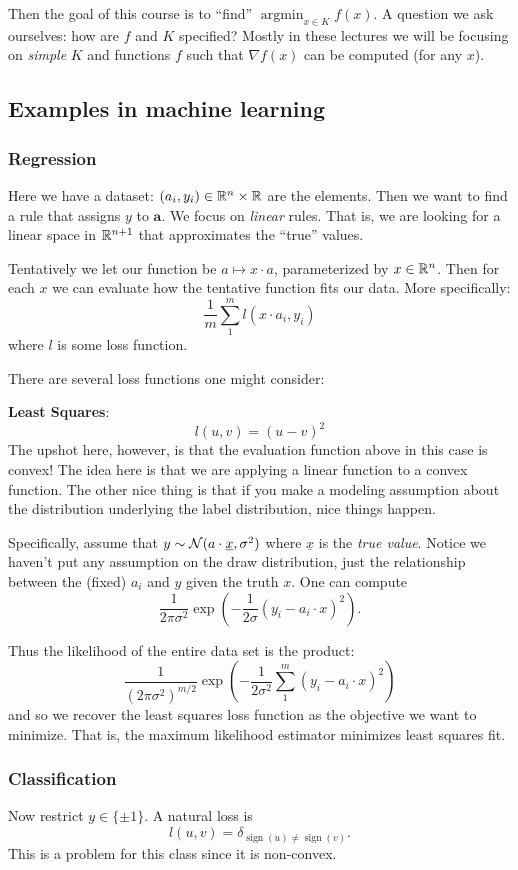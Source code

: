 \documentclass[12pt]{article}
\begin{document}
Then the goal of this course is to ``find'' $\operatorname{argmin}_{x\in K}f(x)$. A question we ask ourselves: how are $f$ and $K$ specified? Mostly in these lectures we will be 
focusing on \textit{simple} $K$ and functions $f$ such that $\nabla f(x)$ can be computed (for any $x$).

\subsection{Examples in machine learning}
\subsubsection{Regression}
Here we have a dataset: $(a_i,y_i)\in\mathbb{R}^n\times\mathbb{R}$ are the elements. Then we want to find a rule that assigns $y$ to $\mathbf a$. We focus on \textit{linear} rules.
That is, we are looking for a linear space in $\mathbb{R}^{n+1}$ that approximates the ``true'' values.

Tentatively we let our function be $a\mapsto x\cdot a$, parameterized by $x\in\mathbb{R}^n$. Then for each $x$ we can evaluate how the tentative function
fits our data. More specifically:
\[\frac{1}{m}\sum_1^m l(x\cdot a_i,y_i)\]
where $l$ is some loss function.

There are several loss functions one might consider:

\noindent\textbf{Least Squares}: 
\[l(u,v)=(u-v)^2\] 
The upshot here, however, is that the evaluation function above in this case is convex!
The idea here is that we are applying a linear function to a convex function. The other nice thing is that if you make a modeling assumption about the 
distribution underlying the label distribution, nice things happen.

Specifically, assume that $y\sim\mathcal{N}(a\cdot \underline x,\sigma^2)$ where $\underline x$ is the \textit{true value}.
Notice we haven't put any assumption on the draw distribution, just the relationship between the (fixed) $a_i$ and $y$ given the truth $x$. One can compute 
\[\frac{1}{2\pi\sigma^2}\exp(-\frac{1}{2\sigma}(y_i-a_i\cdot x)^2).\]

Thus the likelihood of the entire data set is the product:
\[\frac{1}{(2\pi\sigma^2)^{m/2}}\exp(-\frac{1}{2\sigma^2}\sum_1^m(y_i-a_i\cdot x)^2)\]
and so we recover the least squares loss function as the objective we want to minimize. That is, the maximum likelihood estimator minimizes least squares fit.

\subsubsection{Classification}
Now restrict $y\in\{\pm 1\}$. A natural loss is 
\[l(u,v)=\delta_{\operatorname{sign}(u)\ne\operatorname{sign}(v)}.\]
This is a problem for this class since it is non-convex.
\end{document}
